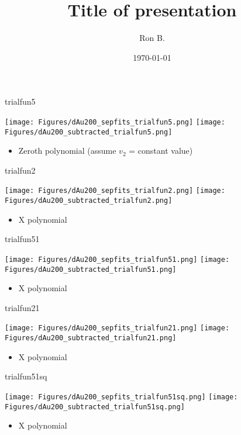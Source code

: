 \documentclass[aspectratio=169,compress,10pt]{beamer}
\title[Title of presentation]{Title of presentation}
\author[Ron B.]{Ron B.}
\institute[UNCG]{\normalsize University of North Carolina Greensboro}
\date[\today]{\today}
\begin{document}

\begin{frame}{trialfun5}
\begin{center}
\texttt{[image: Figures/dAu200\_sepfits\_trialfun5.png]}
\texttt{[image: Figures/dAu200\_subtracted\_trialfun5.png]}
\end{center}
\begin{itemize}
\item Zeroth polynomial (assume $v_2$ = constant value)
\end{itemize}
\end{frame}


\begin{frame}{trialfun2}
\begin{center}
\texttt{[image: Figures/dAu200\_sepfits\_trialfun2.png]}
\texttt{[image: Figures/dAu200\_subtracted\_trialfun2.png]}
\end{center}
\begin{itemize}
\item X polynomial
\end{itemize}
\end{frame}


\begin{frame}{trialfun51}
\begin{center}
\texttt{[image: Figures/dAu200\_sepfits\_trialfun51.png]}
\texttt{[image: Figures/dAu200\_subtracted\_trialfun51.png]}
\end{center}
\begin{itemize}
\item X polynomial
\end{itemize}
\end{frame}


\begin{frame}{trialfun21}
\begin{center}
\texttt{[image: Figures/dAu200\_sepfits\_trialfun21.png]}
\texttt{[image: Figures/dAu200\_subtracted\_trialfun21.png]}
\end{center}
\begin{itemize}
\item X polynomial
\end{itemize}
\end{frame}


\begin{frame}{trialfun51sq}
\begin{center}
\texttt{[image: Figures/dAu200\_sepfits\_trialfun51sq.png]}
\texttt{[image: Figures/dAu200\_subtracted\_trialfun51sq.png]}
\end{center}
\begin{itemize}
\item X polynomial
\end{itemize}
\end{frame}
\end{document}
